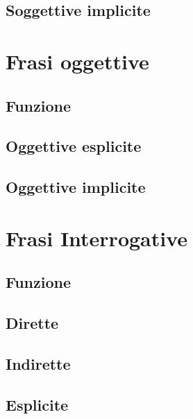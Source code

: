 \documentclass[a4paper,twoside,11pt,chapterprefix=false,bibliography=totocnumbered,listof=flat]{scrbook}
\begin{document}
\hypertarget{soggettive-implicite}{%
\section{Soggettive implicite}\label{soggettive-implicite}}

\hypertarget{frasi-oggettive}{%
\chapter{Frasi oggettive}\label{frasi-oggettive}}

\hypertarget{funzione-1}{%
\section{Funzione}\label{funzione-1}}

\hypertarget{oggettive-esplicite}{%
\section{Oggettive esplicite}\label{oggettive-esplicite}}

\hypertarget{oggettive-implicite}{%
\section{Oggettive implicite}\label{oggettive-implicite}}

\hypertarget{frasi-interrogative}{%
\chapter{Frasi Interrogative}\label{frasi-interrogative}}

\hypertarget{funzione-2}{%
\section{Funzione}\label{funzione-2}}

\hypertarget{dirette}{%
\section{Dirette}\label{dirette}}

\hypertarget{indirette}{%
\section{Indirette}\label{indirette}}

\hypertarget{esplicite}{%
\section{Esplicite}\label{esplicite}}
\end{document}
